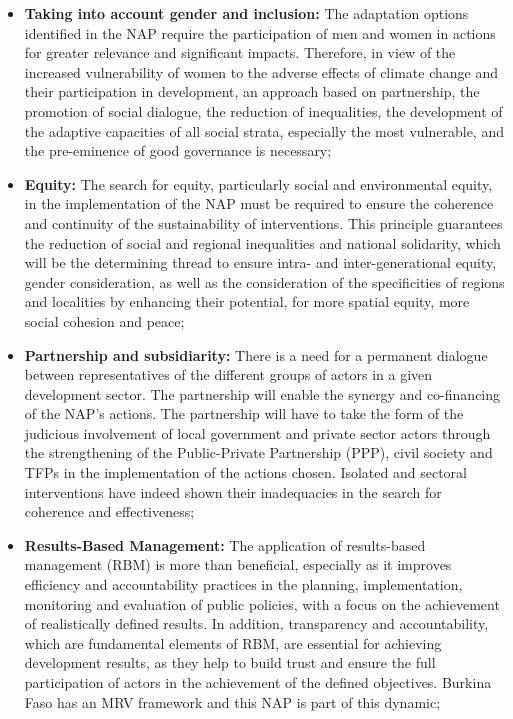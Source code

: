 \documentclass[
]{book}
\begin{document}
\begin{itemize}
\item
  \textbf{Taking into account gender and inclusion:} The adaptation options identified in the NAP require the participation of men and women in actions for greater relevance and significant impacts. Therefore, in view of the increased vulnerability of women to the adverse effects of climate change and their participation in development, an approach based on partnership, the promotion of social dialogue, the reduction of inequalities, the development of the adaptive capacities of all social strata, especially the most vulnerable, and the pre-eminence of good governance is necessary;
\item
  \textbf{Equity:} The search for equity, particularly social and environmental equity, in the implementation of the NAP must be required to ensure the coherence and continuity of the sustainability of interventions. This principle guarantees the reduction of social and regional inequalities and national solidarity, which will be the determining thread to ensure intra- and inter-generational equity, gender consideration, as well as the consideration of the specificities of regions and localities by enhancing their potential, for more spatial equity, more social cohesion and peace;
\item
  \textbf{Partnership and subsidiarity:} There is a need for a permanent dialogue between representatives of the different groups of actors in a given development sector. The partnership will enable the synergy and co-financing of the NAP's actions. The partnership will have to take the form of the judicious involvement of local government and private sector actors through the strengthening of the Public-Private Partnership (PPP), civil society and TFPs in the implementation of the actions chosen. Isolated and sectoral interventions have indeed shown their inadequacies in the search for coherence and effectiveness;
\item
  \textbf{Results-Based Management:} The application of results-based management (RBM) is more than beneficial, especially as it improves efficiency and accountability practices in the planning, implementation, monitoring and evaluation of public policies, with a focus on the achievement of realistically defined results. In addition, transparency and accountability, which are fundamental elements of RBM, are essential for achieving development results, as they help to build trust and ensure the full participation of actors in the achievement of the defined objectives. Burkina Faso has an MRV framework and this NAP is part of this dynamic;

\end{itemize}
\end{document}
